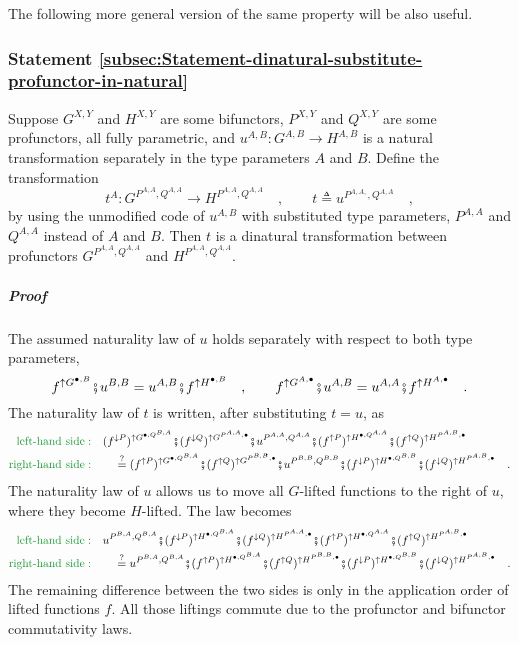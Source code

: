 The following more general version of the same property will be also
useful.

\subsubsection{Statement \label{subsec:Statement-dinatural-substitute-profunctor-in-natural}\ref{subsec:Statement-dinatural-substitute-profunctor-in-natural}}

Suppose $G^{X,Y}$ and $H^{X,Y}$ are some bifunctors, $P^{X,Y}$
and $Q^{X,Y}$ are some profunctors, all fully parametric, and $u^{A,B}:G^{A,B}\rightarrow H^{A,B}$
is a natural transformation separately in the type parameters $A$
and $B$. Define the transformation 
\[
t^{A}:G^{P^{A,A},Q^{A,A}}\rightarrow H^{P^{A,A},Q^{A,A}}\quad,\quad\quad t\triangleq u^{P^{A,A,},Q^{A,A}}\quad,
\]
by using the unmodified code of $u^{A,B}$ with substituted type parameters,
$P^{A,A}$ and $Q^{A,A}$ instead of $A$ and $B$. Then $t$ is a
dinatural transformation between profunctors $G^{P^{A,A},Q^{A,A}}$
and $H^{P^{A,A},Q^{A,A}}$.

\subparagraph{Proof}

The assumed naturality law of $u$ holds separately with respect to
both type parameters,
\[
f^{\uparrow G^{\bullet,B}}\bef u^{B,B}=u^{A,B}\bef f^{\uparrow H^{\bullet,B}}\quad,\quad\quad f^{\uparrow G^{A,\bullet}}\bef u^{A,B}=u^{A,A}\bef f^{\uparrow H^{A,\bullet}}\quad.
\]
 The naturality law of $t$ is written, after substituting $t=u$,
as
\begin{align*}
{\color{greenunder}\text{left-hand side}:}\quad & (f^{\downarrow P})^{\uparrow G^{\bullet,Q^{B,A}}}\bef(f^{\downarrow Q})^{\uparrow G^{P^{A,A},\bullet}}\bef u^{P^{A,A},Q^{A,A}}\bef(f^{\uparrow P})^{\uparrow H^{\bullet,Q^{A,A}}}\bef(f^{\uparrow Q})^{\uparrow H^{P^{A,B},\bullet}}\\
{\color{greenunder}\text{right-hand side}:}\quad & \quad\overset{?}{=}(f^{\uparrow P})^{\uparrow G^{\bullet,Q^{B,A}}}\bef(f^{\uparrow Q})^{\uparrow G^{P^{B,B},\bullet}}\bef u^{P^{B,B},Q^{B,B}}\bef(f^{\downarrow P})^{\uparrow H^{\bullet,Q^{B,B}}}\bef(f^{\downarrow Q})^{\uparrow H^{P^{A,B},\bullet}}\quad.
\end{align*}
The naturality law of $u$ allows us to move all $G$-lifted functions
to the right of $u$, where they become $H$-lifted. The law becomes
\begin{align*}
{\color{greenunder}\text{left-hand side}:}\quad & u^{P^{B,A},Q^{B,A}}\bef(f^{\downarrow P})^{\uparrow H^{\bullet,Q^{B,A}}}\bef(f^{\downarrow Q})^{\uparrow H^{P^{A,A},\bullet}}\bef(f^{\uparrow P})^{\uparrow H^{\bullet,Q^{A,A}}}\bef(f^{\uparrow Q})^{\uparrow H^{P^{A,B},\bullet}}\\
{\color{greenunder}\text{right-hand side}:}\quad & \quad\overset{?}{=}u^{P^{B,A},Q^{B,A}}\bef(f^{\uparrow P})^{\uparrow H^{\bullet,Q^{B,A}}}\bef(f^{\uparrow Q})^{\uparrow H^{P^{B,B},\bullet}}\bef(f^{\downarrow P})^{\uparrow H^{\bullet,Q^{B,B}}}\bef(f^{\downarrow Q})^{\uparrow H^{P^{A,B},\bullet}}\quad.
\end{align*}
The remaining difference between the two sides is only in the application
order of lifted functions $f$. All those liftings commute due to
the profunctor and bifunctor commutativity laws.

